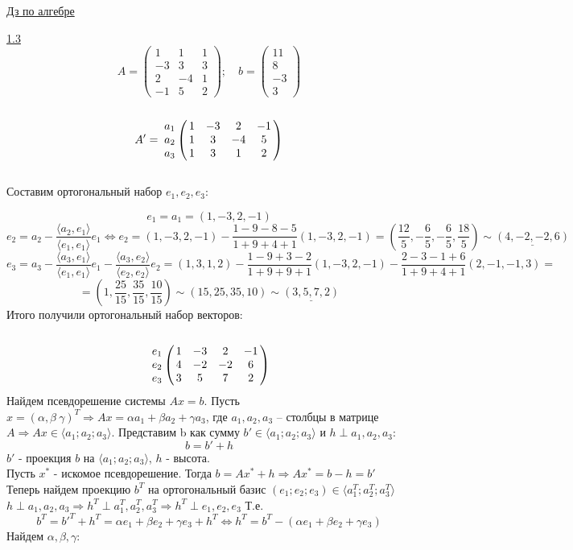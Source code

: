 \documentclass{article}
\begin{document}
\large
\begin{center}
    \underline{Дз по алгебре}
\end{center}
\underline{1.3} 
\[ A = \left(\begin{array}{ccc}
    1 & 1 & 1 \\
    -3 & 3 & 3 \\
    2 & -4 & 1 \\
    -1 & 5 & 2
\end{array} \right); \quad
b = \left(\begin{array}{c}
     11  \\
     8 \\
     -3 \\
     3
\end{array}\right)\]
\[ A' = \bordermatrix{
& & &\cr
a_1 & 1 & -3 & 2 & -1\cr
a_2 & 1 & 3 & -4 & 5\cr
a_3 & 1 & 3 & 1 & 2 \cr
} \] \\
Составим ортогональный набор $e_1, e_2, e_3$:

\[e_1 = a_1 = (1, -3, 2, -1) \]
\[e_2 = a_2 - \frac{\langle a_2, e_1\rangle}{\langle e_1, e_1 \rangle}e_1  \Leftrightarrow
e_2 = (1, -3, 2, -1) - \frac{1 - 9 - 8 - 5}{1 + 9 + 4 + 1}(1, -3, 2, -1) = 
(\frac{12}{5}, -\frac{6}{5}, -\frac{6}{5}, \frac{18}{5}) \sim \underline{(4, -2, -2, 6)}
\]
\[
e_3 = a_3 - \frac{\langle a_3, e_1 \rangle}{\langle e_1, e_1 \rangle}e_1 - 
\frac{\langle a_3, e_2 \rangle}{\langle e_2, e_2\rangle}e_2 = (1, 3, 1, 2) - \frac{1-9+3-2}{1+9+9+1}(1, -3, 2, -1) -
\frac{2 - 3 -1 + 6}{1 + 9 + 4 + 1}(2, -1, -1, 3) = 
\]
\[
 = (1, \frac{25}{15}, \frac{35}{15}, \frac{10}{15}) \sim (15, 25, 35, 10) \sim \underline{(3, 5, 7, 2)}
\]
Итого получили ортогональный набор векторов:
\[\bordermatrix{
& & &\cr
e_1 & 1 & -3 & 2 & -1\cr
e_2 & 4 & -2 & -2 & 6\cr
e_3 & 3 & 5 & 7 & 2 \cr
} \]
Найдем псевдорешение системы $Ax = b$. Пусть $x = (\alpha, \beta\ \gamma)^T\Rightarrow Ax = \alpha a_1 + \beta a_2 +
\gamma a_3$, где $a_1, a_2, a_3$ -- столбцы в матрице $A \Rightarrow Ax \in \langle a_1; a_2; a_3\rangle$. 
Представим b как сумму $b' \in  \langle a_1; a_2; a_3\rangle$ и $h \perp a_1, a_2, a_3$: \[ b = b' + h \]
$b'$ - проекция $b$ на $\langle a_1; a_2; a_3\rangle$, $h$ - высота. \\
Пусть $x^*$ - искомое псевдорешение.
\newpage
Тогда $b = Ax^* + h  \Rightarrow Ax^* = b - h = b'$ \\
Теперь найдем проекцию $b^T$ на ортогональный базис $(e_1; e_2; e_3 ) \in \langle a_1^T; a_2^T; a_3^T \rangle $ \\
$h \perp a_1, a_2, a_3 \Rightarrow h^T \perp a_1^T, a_2^T, a_3^T \Rightarrow h^T \perp e_1, e_2, e_3$ Т.е. \\
\[ b^T = b'^T + h^T  = \alpha e_1 + \beta e_2 + \gamma e_3 + h^T \Leftrightarrow h^T = b^T - 
(\alpha e_1 + \beta e_2 + \gamma e_3)\] 
Найдем $\alpha, \beta, \gamma$: \\
\end{document}

